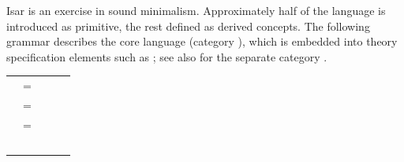 \begin{isabellebody}
\begin{isamarkuptext}
  Isar is an exercise in sound minimalism.  Approximately half of the
  language is introduced as primitive, the rest defined as derived
  concepts.  The following grammar describes the core language
  (category ), which is embedded into theory
  specification elements such as \hyperlink{command.theorem}{\mbox{}}; see also
   for the separate category .

  \medskip
  \begin{tabular}{rcl}
    \isa{{\isaliteral{22}{\isachardoublequote}}theory{\isaliteral{5C3C646173683E}{\isasymdash}}stmt{\isaliteral{22}{\isachardoublequote}}} & = & \hyperlink{command.theorem}{\mbox{\isa{\isacommand{theorem}}}}~\isa{{\isaliteral{22}{\isachardoublequote}}statement\ proof\ \ {\isaliteral{7C}{\isacharbar}}{\isaliteral{22}{\isachardoublequote}}}~~\hyperlink{command.definition}{\mbox{\isa{\isacommand{definition}}}}~\isa{{\isaliteral{22}{\isachardoublequote}}{\isaliteral{5C3C646F74733E}{\isasymdots}}\ \ {\isaliteral{7C}{\isacharbar}}\ \ {\isaliteral{5C3C646F74733E}{\isasymdots}}{\isaliteral{22}{\isachardoublequote}}} \\[1ex]

    \isa{{\isaliteral{22}{\isachardoublequote}}proof{\isaliteral{22}{\isachardoublequote}}} & = & \isa{{\isaliteral{22}{\isachardoublequote}}prfx\isaliteral{5C3C5E7375703E}{}\isactrlsup {\isaliteral{2A}{\isacharasterisk}}{\isaliteral{22}{\isachardoublequote}}}~\hyperlink{command.proof}{\mbox{\isa{\isacommand{proof}}}}~\isa{{\isaliteral{22}{\isachardoublequote}}method\isaliteral{5C3C5E7375703E}{}\isactrlsup {\isaliteral{3F}{\isacharquery}}\ stmt\isaliteral{5C3C5E7375703E}{}\isactrlsup {\isaliteral{2A}{\isacharasterisk}}{\isaliteral{22}{\isachardoublequote}}}~\hyperlink{command.qed}{\mbox{\isa{\isacommand{qed}}}}~\isa{{\isaliteral{22}{\isachardoublequote}}method\isaliteral{5C3C5E7375703E}{}\isactrlsup {\isaliteral{3F}{\isacharquery}}{\isaliteral{22}{\isachardoublequote}}} \\[1ex]

    \isa{prfx} & = & \hyperlink{command.using}{\mbox{\isa{\isacommand{using}}}}~\isa{{\isaliteral{22}{\isachardoublequote}}facts{\isaliteral{22}{\isachardoublequote}}} \\
    & \isa{{\isaliteral{22}{\isachardoublequote}}{\isaliteral{7C}{\isacharbar}}{\isaliteral{22}{\isachardoublequote}}} & \hyperlink{command.unfolding}{\mbox{\isa{\isacommand{unfolding}}}}~\isa{{\isaliteral{22}{\isachardoublequote}}facts{\isaliteral{22}{\isachardoublequote}}} \\


\end{tabular}
\end{isamarkuptext}
\end{isabellebody}
